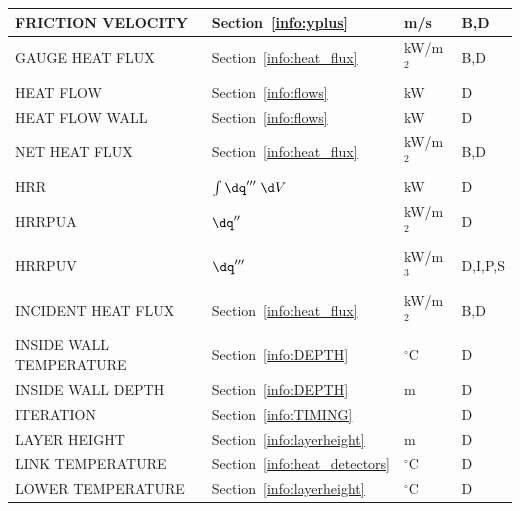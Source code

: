 \documentclass[11pt]{book}
\begin{document}
\begin{longtable}{@{\extracolsep{\fill}}|l|l|l|l|}
{\ct FRICTION VELOCITY}                         & Section~\ref{info:yplus}                      & m/s            & B,D          \\ \hline
{\ct GAUGE HEAT FLUX}                           & Section~\ref{info:heat_flux}                  & kW/m$^2$       & B,D          \\ \hline
{\ct HEAT FLOW}                                 & Section~\ref{info:flows}                      & kW             & D            \\ \hline
{\ct HEAT FLOW WALL}                            & Section~\ref{info:flows}                      & kW             & D            \\ \hline
{\ct NET HEAT FLUX}                             & Section~\ref{info:heat_flux}                  & kW/m$^2$       & B,D          \\ \hline
{\ct HRR}                                       & $\int \dq''' \; \d V$                         & kW             & D            \\ \hline
{\ct HRRPUA}                                    & $\dq''$                                       & kW/m$^2$       & D            \\ \hline
{\ct HRRPUV}                                    & $\dq'''$                                      & kW/m$^3$       & D,I,P,S      \\ \hline
{\ct INCIDENT HEAT FLUX}                        & Section~\ref{info:heat_flux}                  & kW/m$^2$       & B,D          \\ \hline
{\ct INSIDE WALL TEMPERATURE}                   & Section~\ref{info:DEPTH}                      & $^\circ$C      & D            \\ \hline
{\ct INSIDE WALL DEPTH}                         & Section~\ref{info:DEPTH}                      & m              & D            \\ \hline
{\ct ITERATION}                                 & Section~\ref{info:TIMING}                     &                & D            \\ \hline
{\ct LAYER HEIGHT}                              & Section~\ref{info:layerheight}                & m              & D            \\ \hline
{\ct LINK TEMPERATURE}                          & Section~\ref{info:heat_detectors}             & $^\circ$C      & D            \\ \hline
{\ct LOWER TEMPERATURE}                         & Section~\ref{info:layerheight}                & $^\circ$C      & D            \\ \hline

\end{longtable}
\end{document}
